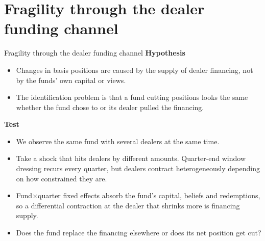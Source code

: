 \documentclass[aspectratio=169,11pt]{beamer}
\begin{document}
\section{Fragility through the dealer funding channel}
\begin{frame}{Fragility through the dealer funding channel}
  \textbf{Hypothesis}
  \begin{itemize}
    \item Changes in basis positions are caused by the supply of dealer financing, not by the funds' own capital or views.
    \item The identification problem is that a fund cutting positions looks the same whether the fund chose to or its dealer pulled the financing.
  \end{itemize}
  \medskip
  \textbf{Test}
  \begin{itemize}
    \item We observe the same fund with several dealers at the same time.
    \item Take a shock that hits dealers by different amounts. Quarter-end window dressing recurs every quarter, but dealers contract heterogeneously depending on how constrained they are.
    \item Fund$\times$quarter fixed effects absorb the fund's capital, beliefs and redemptions, so a differential contraction at the dealer that shrinks more is financing supply.
    \item Does the fund replace the financing elsewhere or does its net position get cut?
  \end{itemize}
\end{frame}
\end{document}
